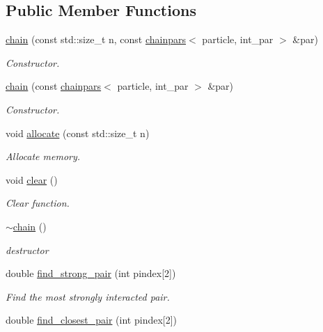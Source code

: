 \subsection*{Public Member Functions}
\begin{DoxyCompactItemize}
\item 
\hyperlink{classARC_1_1chain_a94d6f22a673c1b750b81bb7e21ff03ab}{chain} (const std\+::size\+\_\+t n, const \hyperlink{classARC_1_1chainpars}{chainpars}$<$ particle, int\+\_\+par $>$ \&par)
\begin{DoxyCompactList}\small\item\em Constructor. \end{DoxyCompactList}\item 
\hyperlink{classARC_1_1chain_a78db3f241c1e8662219a3c10f197614b}{chain} (const \hyperlink{classARC_1_1chainpars}{chainpars}$<$ particle, int\+\_\+par $>$ \&par)
\begin{DoxyCompactList}\small\item\em Constructor. \end{DoxyCompactList}\item 
void \hyperlink{classARC_1_1chain_a0c3c1daffa75873b39d9964eebc6566f}{allocate} (const std\+::size\+\_\+t n)
\begin{DoxyCompactList}\small\item\em Allocate memory. \end{DoxyCompactList}\item 
void \hyperlink{classARC_1_1chain_a61d47f9599d4f7176b8870f825305011}{clear} ()
\begin{DoxyCompactList}\small\item\em Clear function. \end{DoxyCompactList}\item 
\hyperlink{classARC_1_1chain_a4e9c6711eb95c5614cd28b14d33ec3eb}{$\sim$chain} ()
\begin{DoxyCompactList}\small\item\em destructor \end{DoxyCompactList}\item 
double \hyperlink{classARC_1_1chain_a7e4f81985bb88e0fb0fcc739b9790396}{find\+\_\+strong\+\_\+pair} (int pindex\mbox{[}2\mbox{]})
\begin{DoxyCompactList}\small\item\em Find the most strongly interacted pair. \end{DoxyCompactList}\item 
double \hyperlink{classARC_1_1chain_a0c0cadba6cebb17e4d55b40ac98a608a}{find\+\_\+closest\+\_\+pair} (int pindex\mbox{[}2\mbox{]})

\end{DoxyCompactItemize}

